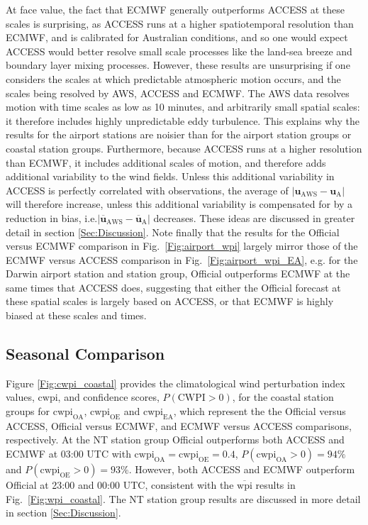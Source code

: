 \documentclass[alpha-refs]{wiley-article}
\begin{document}
At face value, the fact that ECMWF generally outperforms ACCESS at these scales is surprising, as ACCESS runs at a higher spatiotemporal resolution than ECMWF, and is calibrated for Australian conditions, and so one would expect ACCESS would better resolve small scale processes like the land-sea breeze and boundary layer mixing processes. However, these results are unsurprising if one considers the scales at which predictable atmospheric motion occurs, and the scales being resolved by AWS, ACCESS and ECMWF. The AWS data resolves motion with time scales as low as 10 minutes, and arbitrarily small spatial scales: it therefore includes highly unpredictable eddy turbulence. This explains why the results for the airport stations are noisier than for the airport station groups or coastal station groups. Furthermore, because ACCESS runs at a higher resolution than ECMWF, it includes additional scales of motion, and therefore adds additional variability to the wind fields. Unless this additional variability in ACCESS is perfectly correlated with observations, the average of $\left\lvert \boldsymbol{u}_{\text{AWS}}-\boldsymbol{u}_{\text{A}} \right\rvert$
will therefore increase, unless this additional variability is compensated for by a reduction in bias, i.e.$\left\lvert \overline{\boldsymbol{u}}_{\text{AWS}}-\overline{\boldsymbol{u}}_{\text{A}} \right\rvert$ decreases. These ideas are discussed in greater detail in section \ref{Sec:Discussion}. Note finally that the results for the Official versus ECMWF comparison in Fig.~\ref{Fig:airport_wpi} largely mirror those of the ECMWF versus ACCESS comparison in Fig.~\ref{Fig:airport_wpi_EA}, e.g. for the Darwin airport station and station group, Official outperforms ECMWF at the same times that ACCESS does, suggesting that either the Official forecast at these spatial scales is largely based on ACCESS, or that ECMWF is highly biased at these scales and times.

\subsection{Seasonal Comparison}
\label{Sec:Seasonal}
Figure \ref{Fig:cwpi_coastal} provides the climatological wind perturbation index values, $\text{cwpi}$, and confidence scores, $P\left(\text{CWPI}>0\right)$, for the coastal station groups for $\text{cwpi}_\text{OA}$, $\text{cwpi}_\text{OE}$ and $\text{cwpi}_\text{EA}$, which represent the the Official versus ACCESS, Official versus ECMWF, and ECMWF versus ACCESS comparisons, respectively. At the NT station group Official outperforms both ACCESS and ECMWF at 03:00 UTC with $\text{cwpi}_\text{OA} = \text{cwpi}_\text{OE} = 0.4$, $P\left(\text{cwpi}_\text{OA}>0\right) = 94\%$ and $P\left(\text{cwpi}_\text{OE}>0\right) = 93\%$. However, both ACCESS and ECMWF outperform Official at 23:00 and 00:00 UTC, consistent with the $\overline{\text{wpi}}$ results in Fig.~\ref{Fig:wpi_coastal}. The NT station group results are discussed in more detail in section \ref{Sec:Discussion}.
\end{document}

